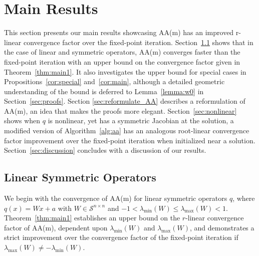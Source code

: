\documentclass[11pt]{article}
\begin{document}
\section{Main Results}\label{sec:main}
This section presents our main results showcasing AA(m) has an improved r-linear convergence factor over the fixed-point iteration. Section~\ref{sec:linear} shows that in the case of linear and symmetric operators, AA(m) converges faster than the fixed-point iteration with {\color{black} an upper bound on the convergence factor} given in Theorem~\ref{thm:main1}. {\color{black}It also investigates the upper bound for special cases in Propositions~\ref{cor:special} and~\ref{cor:main}, although a detailed geometric understanding of the bound is deferred to Lemma~\ref{lemma:w0} in Section~\ref{sec:proofs}.} Section \ref{sec:reformulate_AA} describes a reformulation of AA(m), an idea that makes the proofs more elegant. 
Section~\ref{sec:nonlinear} shows when $q$ is nonlinear, yet has
a symmetric Jacobian at the solution, a
modified version of Algorithm~\ref{alg:aa} has an analogous root-linear convergence factor improvement over the fixed-point iteration when initialized near a solution.
Section~\ref{sec:discussion}  concludes with a discussion of our results. %

\subsection{Linear Symmetric Operators}\label{sec:linear}
We begin with the convergence of AA(m) for linear symmetric operators $q$, where $q(x)=Wx+a$ with
$W \in \mathcal{S}^{n\times n}$ and $-1< \lambda_{\min}(W)\leq \lambda_{\max}(W)< 1$. 
{\color{black}Theorem~\ref{thm:main1} establishes 
an upper bound on the $r$-linear convergence factor of AA(m), dependent upon  $\lambda_{\min}(W)$ and $\lambda_{\max}(W)$, and demonstrates a strict improvement over the convergence factor of the fixed-point iteration if $\lambda_{\max}(W) \neq -\lambda_{\min}(W)$.}
\end{document}
